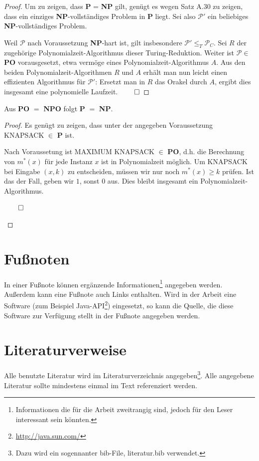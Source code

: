 \begin{proof} Um zu zeigen, dass \textbf{P} = \textbf{NP} gilt, genügt es
wegen Satz A.30 zu zeigen, dass ein einziges \textbf{NP}-vollständiges
Problem in \textbf{P} liegt. Sei also $\mathcal{P}'$ ein beliebiges \textbf{NP}-vollständiges Problem.

Weil $\mathcal{P}$ nach Voraussetzung \textbf{NP}-hart ist, gilt insbesondere
$\mathcal{P}' \leq_T \mathcal{P}_C$. Sei $R$ der zugehörige
Polynomialzeit-Algorithmus dieser Turing-Reduktion.
Weiter ist $\mathcal{P} \in$ \textbf{PO} vorausgesetzt, etwa vermöge eines
Polynomialzeit-Algorithmus $A$. Aus den beiden
Polynomialzeit-Algorithmen $R$ und $A$ erhält man nun
leicht einen effizienten Algorithmus für $\mathcal{P}'$: Ersetzt man
in $R$ das Orakel durch $A$, ergibt dies insgesamt eine polynomielle
Laufzeit. 
$\qed$
\end{proof}

\begin{lemma} Aus \textbf{PO} $=$ \textbf{NPO} folgt \textbf{P} $=$ \textbf{NP}.
\end{lemma}

\begin{proof} Es genügt zu zeigen, dass unter der angegeben
Voraussetzung KNAPSACK $\in$ \textbf{P} ist.

Nach Voraussetung ist MAXIMUM KNAPSACK $\in$ \textbf{PO},
d.h. die Berechnung von $m^*(x)$ für jede Instanz $x$ ist
in Polynomialzeit möglich. Um KNAPSACK bei Eingabe
$(x,k)$ zu entscheiden, müssen wir nur noch $m^*(x) \geq k$
prüfen. Ist das der Fall, geben wir $1$, sonst $0$ aus. Dies
bleibt insgesamt ein Polynomialzeit-Algorithmus. 
\begin{flushright}
$\qed$
\end{flushright}
\end{proof}

\section{Fußnoten}

In einer Fußnote können ergänzende Informationen\footnote{Informationen die für die Arbeit zweitrangig sind, jedoch für den Leser interessant sein könnten.} angegeben werden. Außerdem kann eine Fußnote auch Links enthalten. Wird in der Arbeit eine Software (zum Beispiel Java-API\footnote{\url{http://java.sun.com/}}) eingesetzt, so kann die Quelle, die diese Software zur Verfügung stellt in der Fußnote angegeben werden.

\section{Literaturverweise}
Alle benutzte Literatur wird im Literaturverzeichnis angegeben\footnote{Dazu wird ein sogennanter bib-File, literatur.bib verwendet.}. Alle angegebene Literatur sollte mindestens einmal im Text referenziert werden\cite{Coulouris:02}.